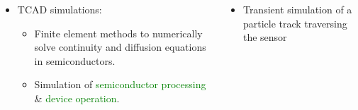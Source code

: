 \begin{frame}
\begin{columns}[t]
  \end{columns}

  \begin{columns}[t]
    \begin{itemize}
    \item TCAD simulations:
      \begin{itemize}
      \item Finite element methods to numerically solve continuity and
        diffusion equations in semiconductors.
      \item Simulation of \textcolor{Green}{semiconductor processing}
        \& \textcolor{Green}{device operation}.
      \end{itemize}
    \end{itemize}

    \begin{itemize}
    \item Transient simulation of a particle track traversing the
      sensor
    \end{itemize}

    \centering
  \end{columns}

\end{frame}

